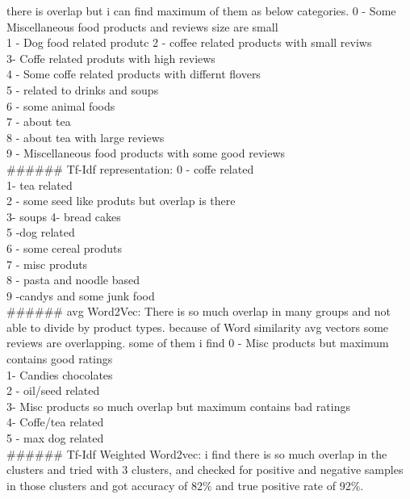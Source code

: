 \documentclass[11pt]{article}
\begin{document}
there is overlap but i can find maximum of them as below categories. 0 -
Some Miscellaneous food products and reviews size are small\\
1 - Dog food related produtc 2 - coffee related products with small
reviws\\
3- Coffe related produts with high reviews\\
4 - Some coffe related products with differnt flovers\\
5 - related to drinks and soups\\
6 - some animal foods\\
7 - about tea\\
8 - about tea with large reviews\\
9 - Miscellaneous food products with some good reviews\\
\#\#\#\#\#\# Tf-Idf representation: 0 - coffe related\\
1- tea related\\
2 - some seed like produts but overlap is there\\
3- soups 4- bread cakes\\
5 -dog related\\
6 - some cereal produts\\
7 - misc produts\\
8 - pasta and noodle based\\
9 -candys and some junk food\\
\#\#\#\#\#\# avg Word2Vec: There is so much overlap in many groups and
not able to divide by product types. because of Word similarity avg
vectors some reviews are overlapping. some of them i find 0 - Misc
products but maximum contains good ratings\\
1- Candies chocolates\\
2 - oil/seed related\\
3- Misc products so much overlap but maximum contains bad ratings\\
4- Coffe/tea related\\
5 - max dog related\\
\#\#\#\#\#\# Tf-Idf Weighted Word2vec: i find there is so much overlap
in the clusters and tried with 3 clusters, and checked for positive and
negative samples in those clusters and got accuracy of 82\% and true
positive rate of 92\%.


    
    
    
    
\end{document}
